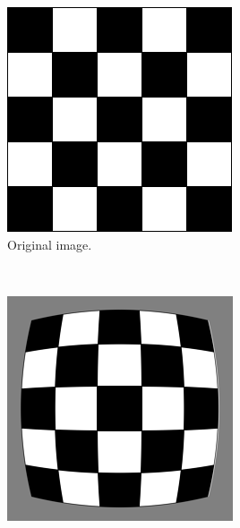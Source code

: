 \begin{figure}[h!]
	\centering
	\begin{subfigure}[t]{0.3\textwidth}
		\centering
		\includegraphics[width=\textwidth]{img/study_of_literature_stereo_camera_distortion_barell_distortion1.png}
		\caption{Original image.}
	\end{subfigure}%
	~ 
	\begin{subfigure}[t]{0.3\textwidth}
		\centering
		\includegraphics[width=\textwidth]{img/study_of_literature_stereo_camera_distortion_barell_distortion2.png}

\end{subfigure}
\end{figure}
